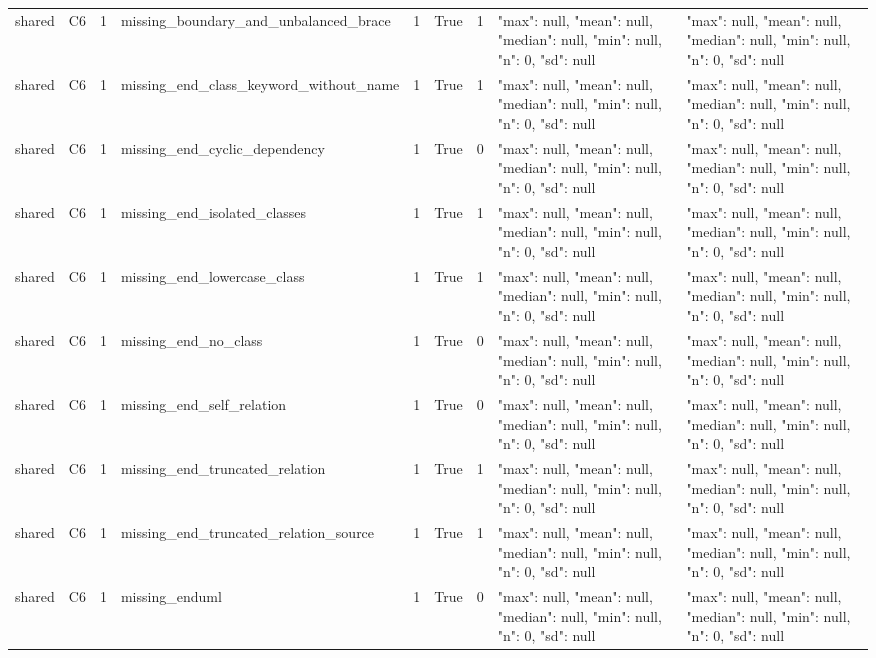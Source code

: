 \begin{tabular}{lllllllll}
shared & C6 & 1 & missing\_boundary\_and\_unbalanced\_brace & 1 & True & 1 & {"max": null, "mean": null, "median": null, "min": null, "n": 0, "sd": null} & {"max": null, "mean": null, "median": null, "min": null, "n": 0, "sd": null} \\
shared & C6 & 1 & missing\_end\_class\_keyword\_without\_name & 1 & True & 1 & {"max": null, "mean": null, "median": null, "min": null, "n": 0, "sd": null} & {"max": null, "mean": null, "median": null, "min": null, "n": 0, "sd": null} \\
shared & C6 & 1 & missing\_end\_cyclic\_dependency & 1 & True & 0 & {"max": null, "mean": null, "median": null, "min": null, "n": 0, "sd": null} & {"max": null, "mean": null, "median": null, "min": null, "n": 0, "sd": null} \\
shared & C6 & 1 & missing\_end\_isolated\_classes & 1 & True & 1 & {"max": null, "mean": null, "median": null, "min": null, "n": 0, "sd": null} & {"max": null, "mean": null, "median": null, "min": null, "n": 0, "sd": null} \\
shared & C6 & 1 & missing\_end\_lowercase\_class & 1 & True & 1 & {"max": null, "mean": null, "median": null, "min": null, "n": 0, "sd": null} & {"max": null, "mean": null, "median": null, "min": null, "n": 0, "sd": null} \\
shared & C6 & 1 & missing\_end\_no\_class & 1 & True & 0 & {"max": null, "mean": null, "median": null, "min": null, "n": 0, "sd": null} & {"max": null, "mean": null, "median": null, "min": null, "n": 0, "sd": null} \\
shared & C6 & 1 & missing\_end\_self\_relation & 1 & True & 0 & {"max": null, "mean": null, "median": null, "min": null, "n": 0, "sd": null} & {"max": null, "mean": null, "median": null, "min": null, "n": 0, "sd": null} \\
shared & C6 & 1 & missing\_end\_truncated\_relation & 1 & True & 1 & {"max": null, "mean": null, "median": null, "min": null, "n": 0, "sd": null} & {"max": null, "mean": null, "median": null, "min": null, "n": 0, "sd": null} \\
shared & C6 & 1 & missing\_end\_truncated\_relation\_source & 1 & True & 1 & {"max": null, "mean": null, "median": null, "min": null, "n": 0, "sd": null} & {"max": null, "mean": null, "median": null, "min": null, "n": 0, "sd": null} \\
shared & C6 & 1 & missing\_enduml & 1 & True & 0 & {"max": null, "mean": null, "median": null, "min": null, "n": 0, "sd": null} & {"max": null, "mean": null, "median": null, "min": null, "n": 0, "sd": null} \\

\end{tabular}
